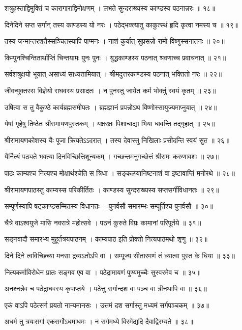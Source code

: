 शत्रुहस्ताद्विमुक्तिं च कारागाराद्विमोक्षणम् ।
लभते सुन्दराख्यस्य काण्डस्य पठनान्नरः ॥ १८॥

दिनेदिने सप्त सर्गान् तस्य काण्डस्य यो नरः ।
पठेद्भक्त्यातु काकुत्स्थं हृदि कृत्वा नमस्य च ॥ १९॥

तस्य जन्मान्तरशतैस्सञ्चितस्यापि पाप्मनः ।
नाशं कुर्यात् सुप्रसन्नो रामो विष्णुस्सनातनः ॥ २०॥

किम्पुनश्चिन्तितार्थाप्तिं चिन्तयामः पुनः पुनः ।
युद्धकाण्डस्य पठनात् श्रवणाच्च प्रवाचनात् ॥ २१॥

सर्वशत्रुक्षयो भूयात् असाध्यं साध्यतामियात् ।
श्रीमदुत्तरकाण्डस्य पठनात् भक्तितो नरः ॥ २२॥

जीवन्मुक्तस्स विज्ञेयो राघवस्य प्रसादतः ।
न पुनस्तु जायेत कर्म भोक्तुं स्वयं कृतम् ॥ २३॥

उषित्वा स तु वैकुण्ठे कार्यब्रह्मसमीपतः ।
ब्रह्मज्ञानं प्रपन्नोऽथ विष्णोस्सायुज्यमाप्नुयात् ॥ २४॥

येषां गृहेषु तिष्ठेत श्रीरामायणपुस्तकम् ।
यक्षरक्षः पिशाचाद्या भिया धावन्ति तद्गृहात् ॥ २५॥

श्रीरामायणकोशस्य यैः पूजा क्रियतेऽऽदरात् ।
तस्य देवास्तु निखिलाः प्रसीदन्ति स्वयं सुत ॥ २६॥

यैर्नित्यं पठ्यते भक्त्या दिनविच्छित्तिशून्यकम् ।
गच्छन्तमनुगच्छेत्तं श्रीरामः करुणावशः ॥ २७॥

पाठः काम्यश्च नित्यश्च मोक्षार्थश्चेति स त्रिधा ।
सङ्कल्प्यानिष्टनाशं वा इष्टावाप्तिं मनोरथे ॥ २८॥

श्रीरामायणपाठस्तु काम्यस्स परिकीर्तितः ।
काण्डस्य सुन्दराख्यस्य सप्तसर्गीविधानतः ॥ २९॥

सम्पूर्णस्यापि षट्काण्डसम्मितस्य विधानतः ।
पुनर्वसौ समारम्भः सम्पूर्तिश्च पुनर्वसौ ॥ ३०॥

चैत्रे वाऽश्वयुजे मासि नवरात्रे महोत्सवे ।
पठनं कुरुते विप्रः कामानां परिपूर्तये ॥ ३१॥

सङ्गवादौ समारभ्य मुहूर्तत्रयपाठनम् ।
काम्यपाठ इति प्रोक्तो नित्यपाठमथो श‍ृणु ॥ ३२॥

दिने दिने त्वविच्छिच्या मनसा द्रव्यऽतोऽपि वा ।
सम्पूज्य सीतारमणं तं ध्यात्वा पुस्त के धिया ॥ ३३॥

नित्यकर्माविरोधेन प्रातः सङ्गव एव वा ।
पठेद्रामायणं पुण्यमुच्चैः सुस्वरमेव च ॥ ३५॥

अनश्नन्नेव च पठेद्राघवस्य कृपाप्तये ।
पठेत्तु सर्गान्दश वा पञ्च वा त्रीनथापि वा ॥ ३६॥

एकं वाऽपि पठेत्सर्ग प्रयतो नान्यमानसः ।
उत्तमं दश सर्गास्तु मध्यमं सर्गपञ्चकम् ॥ ३७॥

अधर्म तु त्रयःसर्गा एकसर्गोऽधमाधमः ।
न सर्गमध्ये विरमेद्यदि दैवाद्विरम्यते ॥ ३८॥

